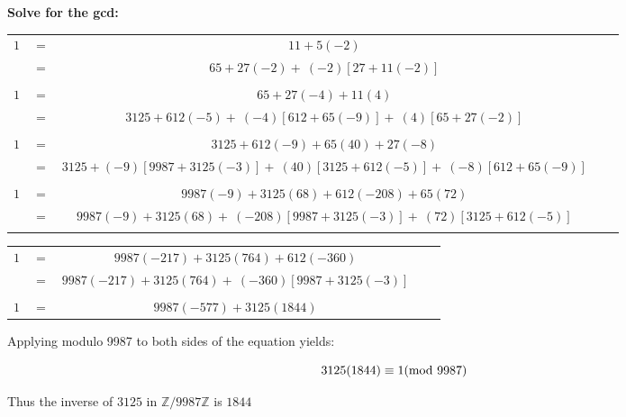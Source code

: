 \documentclass{article}
\numberwithin{equation}{subsection}
\begin{document}
	\vspace{15pt}
	\textbf{Solve for the gcd:}
	
	\begin{center}
		\begin{tabular}{c c c c c}
			$1$	&	$=$	&	$11+5(-2)$	\\
					&	$=$	&	$65+27(-2) + \ (-2)[27+11(-2)]$	\\\\
			$1$		&	$=$	&	$65+27(-4) + 11(4)$	\\
						&	$=$	&	$3125+612(-5)+ \ (-4)[612+65(-9)] + \ (4)[65+27(-2)]$	\\\\
			$1$		&	$=$	&	$3125+612(-9) +65(40) + 27(-8)$	\\
						&	$=$	&	$3125+(-9)[9987+3125(-3)] + \ (40)[3125+612(-5)] + \ (-8)[612+65(-9)]$	\\\\
			$1$		&	$=$	&	$9987(-9) + 3125(68) + 612(-208) + 65(72)$	\\
						&	$=$	&	$9987(-9) + 3125(68) + \ (-208)[9987+3125(-3)] + \ (72)[3125+612(-5)]$	\\\\
		\end{tabular}
	\end{center}

	\newpage
	\thispagestyle{fancy}

	\begin{center}
		\begin{tabular}{c c c c c}
				$1$		&	$=$	&	$9987(-217) + 3125(764) + 612(-360)$	\\
				&	$=$	&	$9987(-217) + 3125(764) + \ (-360)[9987+3125(-3)]$	\\\\
				$1$&	$=$	&	$9987(-577) + 3125(1844)$\\
		\end{tabular}
	\end{center}

	\vspace{15pt}
	Applying modulo 9987 to both sides of the equation yields:

	\begin{equation}\notag
		3125(1844) \equiv 1 (\textrm{mod}\ 9987)	
	\end{equation}

	Thus the inverse of $3125$ in $\mathbb{Z}/9987\mathbb{Z}$ is $1844$


	\newpage
	\thispagestyle{fancy}
\end{document}

